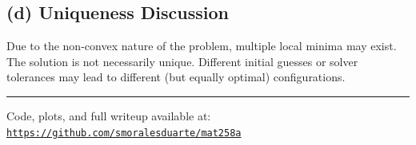\documentclass[11pt]{article}
\begin{document}
\subsection*{(d) Uniqueness Discussion}

Due to the non-convex nature of the problem, multiple local minima may exist. The solution is not necessarily unique. Different initial guesses or solver tolerances may lead to different (but equally optimal) configurations.

\vspace{1em}
\hrule
\vspace{1em}
\noindent Code, plots, and full writeup available at:  
\texttt{\href{https://github.com/smoralesduarte/mat258a/blob/main/spheres.ipynb}{https://github.com/smoralesduarte/mat258a}}
\end{document}
